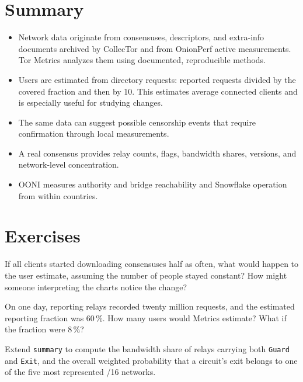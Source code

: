 \section*{Summary}
\begin{itemize}
  \item Network data originate from consensuses, descriptors, and extra-info documents archived by CollecTor and from OnionPerf active measurements. Tor Metrics analyzes them using documented, reproducible methods.
  \item Users are estimated from directory requests: reported requests divided by the covered fraction and then by 10. This estimates average connected clients and is especially useful for studying changes.
  \item The same data can suggest possible censorship events that require confirmation through local measurements.
  \item A real consensus provides relay counts, flags, bandwidth shares, versions, and network-level concentration.
  \item OONI measures authority and bridge reachability and Snowflake operation from within countries.
\end{itemize}

\section*{Exercises}

\begin{esercizio}[1]\label{es:24-dieci}
If all clients started downloading consensuses half as often, what would happen to the user estimate, assuming the number of people stayed constant? How might someone interpreting the charts notice the change?
\end{esercizio}

\begin{esercizio}[1]\label{es:24-frazione}
On one day, reporting relays recorded twenty million requests, and the estimated reporting fraction was 60\,\%. How many users would Metrics estimate? What if the fraction were 8\,\%?
\end{esercizio}

\begin{esercizio}[2]\label{es:24-flag}
Extend \texttt{summary} to compute the bandwidth share of relays carrying both \texttt{Guard} and \texttt{Exit}, and the overall weighted probability that a circuit's exit belongs to one of the five most represented /16 networks.
\end{esercizio}

